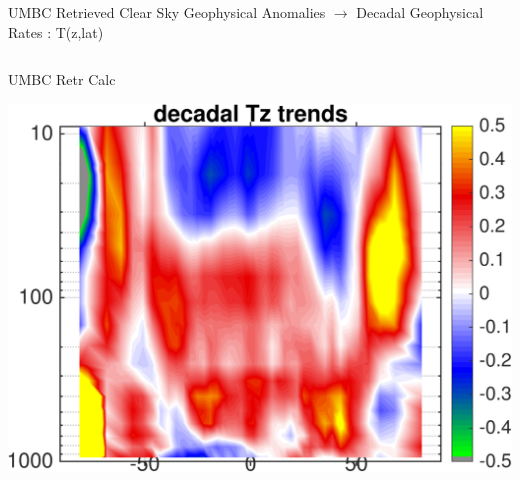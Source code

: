 \documentclass[10pt,t]{beamer}
\begin{document}
\begin{frame}{UMBC Retrieved Clear Sky Geophysical Anomalies $\rightarrow$ Decadal Geophysical Rates : T(z,lat)}
\begin{columns}
\begin{column}{0.45\columnwidth}
\begin{block}{\footnotesize UMBC Retr Calc}
\vspace{-0.1in}
\begin{center}
\includegraphics[width=\linewidth]{Figs/ClearAnom/umbc_clr_retr_cal_wv_rate_200209_201808.png}
\end{center}
\end{block}
\end{column}
\end{columns}

\end{frame}

\end{document}
